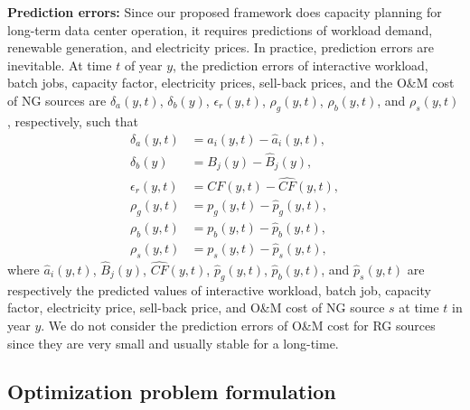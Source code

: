 \textbf{Prediction errors:}
Since our proposed framework does capacity planning for long-term data center operation, it requires predictions of workload demand, renewable generation, and electricity prices. In practice, prediction errors are inevitable. At time $t$ of year $y$, the prediction errors of interactive workload, batch jobs, capacity factor, electricity prices, sell-back prices, and the O\&M cost of NG sources are $\delta_a(y,t)$, $\delta_b(y)$, $\epsilon_r(y,t)$, $\rho_g(y,t)$, $\rho_b(y,t)$, and $\rho_s(y,t)$,  respectively, such that
\begin{align}
\delta_a(y,t) &= a_i(y,t) - \hat{a}_i({y,t}), \nonumber \\
\delta_b(y) &= B_j(y) - \hat{B}_j(y), \nonumber \\
\epsilon_r(y,t) &= CF(y,t) - \hat{CF}(y,t), \nonumber \\
\rho_g(y,t) &= p_g(y,t) - \hat{p}_g(y,t), \nonumber \\
\rho_b(y,t) &= p_b(y,t) - \hat{p}_b(y,t), \nonumber \\
\rho_s(y,t) &= p_s(y,t) - \hat{p}_s(y,t), \nonumber
\end{align}
where $\hat{a}_i({y,t})$, $\hat{B}_j(y)$, $\hat{CF}(y,t)$, $\hat{p}_g(y,t)$, $\hat{p}_b(y,t)$, and $\hat{p}_s(y,t)$ are respectively the predicted values of interactive workload, batch job, capacity factor, electricity price, sell-back price, and O\&M cost of NG source $s$ at time $t$ in year $y$. We do not consider the prediction errors of O\&M cost for RG sources since they are very small and usually stable for a long-time.

\subsection{Optimization problem formulation}


\begin{table}[!ht]
	
\end{table}

